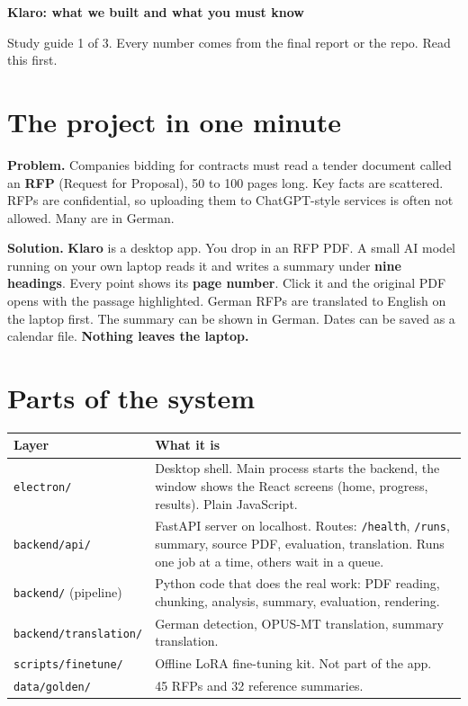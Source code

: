 

{\LARGE\bfseries\color{ac} Klaro: what we built and what you must know}\par
\vspace{2pt}Study guide 1 of 3. Every number comes from the final report or the repo. Read this first.

\section{The project in one minute}
\textbf{Problem.} Companies bidding for contracts must read a tender document called an \textbf{RFP} (Request for Proposal), 50 to 100 pages long. Key facts are scattered. RFPs are confidential, so uploading them to ChatGPT-style services is often not allowed. Many are in German.

\textbf{Solution.} \textbf{Klaro} is a desktop app. You drop in an RFP PDF. A small AI model running on your own laptop reads it and writes a summary under \textbf{nine headings}. Every point shows its \textbf{page number}. Click it and the original PDF opens with the passage highlighted. German RFPs are translated to English on the laptop first. The summary can be shown in German. Dates can be saved as a calendar file. \textbf{Nothing leaves the laptop.}


\section{Parts of the system}
\begin{tabularx}{\linewidth}{@{}p{4.2cm}L@{}}
\toprule
Layer & What it is\\\midrule
\texttt{electron/} & Desktop shell. Main process starts the backend, the window shows the React screens (home, progress, results). Plain JavaScript.\\
\texttt{backend/api/} & FastAPI server on localhost. Routes: \texttt{/health}, \texttt{/runs}, summary, source PDF, evaluation, translation. Runs one job at a time, others wait in a queue.\\
\texttt{backend/} (pipeline) & Python code that does the real work: PDF reading, chunking, analysis, summary, evaluation, rendering.\\
\texttt{backend/translation/} & German detection, OPUS-MT translation, summary translation.\\
\texttt{scripts/finetune/} & Offline LoRA fine-tuning kit. Not part of the app.\\
\texttt{data/golden/} & 45 RFPs and 32 reference summaries.\\\bottomrule
\end{tabularx}


